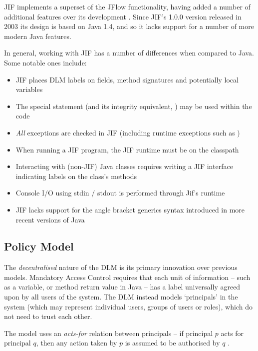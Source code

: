 JIF implements a superset of the JFlow functionality, having added a number of additional features over its development \cite{jifwebsite}. Since JIF's 1.0.0 version released in 2003 its design is based on Java 1.4, and so it lacks support for a number of more modern Java features.

In general, working with JIF has a number of differences when compared to Java. Some notable ones include:

\begin{itemize}
	\item JIF places DLM labels on fields, method signatures and potentially local variables
	
	\item The special  statement (and its integrity equivalent, ) may be used within the code
	
	\item \textit{All} exceptions are checked in JIF (including runtime exceptions such as )
	
	\item When running a JIF program, the JIF runtime must be on the classpath
	
	\item Interacting with (non-JIF) Java classes requires writing a JIF interface indicating labels on the class's methods
	
	\item Console I/O using stdin / stdout is performed through Jif's runtime
	
	\item JIF lacks support for the angle bracket generics syntax introduced in more recent versions of Java
\end{itemize}

\subsection{Policy Model}

The \textit{decentralised} nature of the DLM is its primary innovation over previous models. Mandatory Access Control requires that each unit of information -- such as a variable, or method return value in Java -- has a label universally agreed upon by all users of the system. The DLM instead models `principals' in the system (which may represent individual users, groups of users or roles), which do not need to trust each other.

The model uses an \textit{acts-for} relation between principals -- if principal $ p $ acts for principal $ q $, then any action taken by $ p $ is assumed to be authorised by $ q $ \cite{myers2000dlm}.

